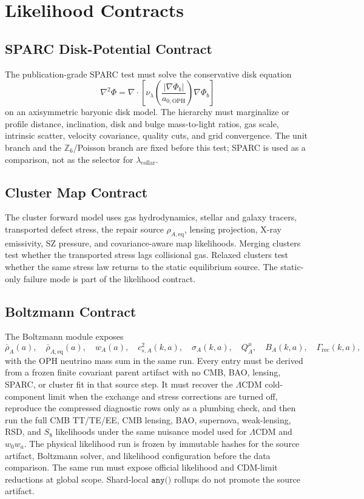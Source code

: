 \documentclass[11pt]{article}
\newcommand{\LCDM}{\Lambda\mathrm{CDM}}
\newcommand{\aoph}{a_{0,\mathrm{OPH}}}
\newcommand{\lambdac}{\lambda_{\mathrm{collar}}}
\newcommand{\Zsix}{\mathbb Z_6}
\begin{document}
\section{Likelihood Contracts}

\subsection{SPARC Disk-Potential Contract}

The publication-grade SPARC test must solve the conservative disk equation
\begin{equation}
  \nabla^2\Phi
  =
  \nabla\cdot
  \left[
    \nu_\lambda\!\left(\frac{|\nabla\Phi_b|}{\aoph}\right)
    \nabla\Phi_b
  \right]
\end{equation}
on an axisymmetric baryonic disk model.  The hierarchy must marginalize or
profile distance, inclination, disk and bulge mass-to-light ratios, gas scale,
intrinsic scatter, velocity covariance, quality cuts, and grid convergence.
The unit branch and the \(\Zsix\)/Poisson branch are fixed before this test;
SPARC is used as a comparison, not as the selector for \(\lambdac\).

\subsection{Cluster Map Contract}

The cluster forward model uses gas hydrodynamics, stellar and galaxy tracers,
transported defect stress, the repair source
\(\rho_{A,\mathrm{eq}}\), lensing projection, X-ray emissivity, SZ pressure,
and covariance-aware map likelihoods.  Merging clusters test whether the
transported stress lags collisional gas.  Relaxed clusters test whether the
same stress law returns to the static equilibrium source.  The static-only
failure mode is part of the likelihood contract.

\subsection{Boltzmann Contract}

The Boltzmann module exposes
\[
  \bar\rho_A(a),\quad
  \bar\rho_{A,\mathrm{eq}}(a),\quad
  w_A(a),\quad
  c_{s,A}^2(k,a),\quad
  \sigma_A(k,a),\quad
  Q_A^\mu,\quad
  B_A(k,a),\quad
  \Gamma_{\mathrm{rec}}(k,a),
\]
with the OPH neutrino mass sum in the same run.  Every entry must be derived
from a frozen finite covariant parent artifact with no CMB, BAO, lensing,
SPARC, or cluster fit in that source step.  It must recover the \(\LCDM\)
cold-component limit when the exchange and stress corrections are turned off,
reproduce the compressed diagnostic rows only as a plumbing check, and then run
the full CMB TT/TE/EE, CMB lensing, BAO, supernova, weak-lensing, RSD, and
\(S_8\) likelihoods under the same nuisance model used for \(\LCDM\) and
\(w_0w_a\).  The physical likelihood run is frozen by immutable hashes for the
source artifact, Boltzmann solver, and likelihood configuration before the data
comparison.  The same run must expose official likelihood and CDM-limit
reductions at global scope. Shard-local \(\texttt{any()}\) rollups do not
promote the source artifact.
\end{document}
